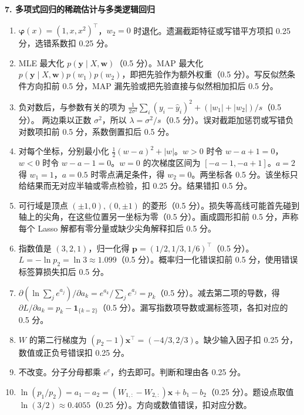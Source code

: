 \noindent\textbf{7. 多项式回归的稀疏估计与多类逻辑回归}
\begin{enumerate}[label=(\arabic*)]
\item $\bm\varphi(x)=(1,x,x^2)^\top$，$w_2=0$ 时退化。遗漏截距特征或写错平方项扣 0.25 分，选错系数扣 0.25 分。
\item MLE 最大化 $p(\bm y\mid X,\bm w)$（0.5 分）。MAP 最大化 $p(\bm y\mid X,\bm w)p(w_1)p(w_2)$，即把先验作为额外权重（0.5 分）。写反似然条件方向扣前 0.5 分，MAP 漏先验或把先验直接与似然相加扣后 0.5 分。
\item 负对数后，与参数有关的项为
$\frac{1}{2\sigma^2}\sum_i(y_i-\hat y_i)^2+(|w_1|+|w_2|)/s$（0.5 分）。
两边乘以正数 $\sigma^2$，所以 $\lambda=\sigma^2/s$（0.5 分）。误对截距加惩罚或写错负对数项扣前 0.5 分，系数倒置扣后 0.5 分。
\item 对每个坐标，分别最小化 $\frac12(w-a)^2+|w|$。$w>0$ 时令 $w-a+1=0$，$w<0$ 时令 $w-a-1=0$。$w=0$ 的次梯度区间为 $[-a-1,-a+1]$。$a=2$ 得 $w_1=1$，$a=0.5$ 时零点满足条件，得 $w_2=0$。两坐标各 0.5 分。该坐标只给结果而无对应半轴或零点检验，扣 0.25 分。结果错扣 0.5 分。
\item 可行域是顶点 $(\pm1,0),(0,\pm1)$ 的菱形（0.5 分）。损失等高线可能首先碰到轴上的尖角，在这些位置另一坐标为零（0.5 分）。画成圆形扣前 0.5 分，声称每个 Lasso 解都有零分量或缺少尖角解释扣后 0.5 分。
\item 指数值是 $(3,2,1)$，归一化得 $\bm p=(1/2,1/3,1/6)^\top$（0.5 分）。$L=-\ln p_2=\ln 3\approx1.099$（0.5 分）。概率归一化错误扣前 0.5 分，使用错误标签算损失扣后 0.5 分。
\item $\partial(\ln\sum_j e^{a_j})/\partial a_k=e^{a_k}/\sum_j e^{a_j}=p_k$（0.5 分）。减去第二项的导数，得 $\partial L/\partial a_k=p_k-\bm 1_{\{k=2\}}$（0.5 分）。漏写指数项导数或漏标签项，各扣对应的 0.5 分。
\item $W$ 的第二行梯度为 $(p_2-1)\bm x^\top=(-4/3,2/3)$。缺少输入因子扣 0.25 分，数值或正负号错误扣 0.25 分。
\item 不改变。分子分母都乘 $e^c$，约去即可。判断和理由各 0.25 分。
\item $\ln(p_1/p_2)=a_1-a_2=(W_{1,:}-W_{2,:})\bm x+b_1-b_2$（0.25 分）。题设点取值 $\ln(3/2)\approx0.4055$（0.25 分）。方向或数值错误，扣对应分数。
\end{enumerate}

